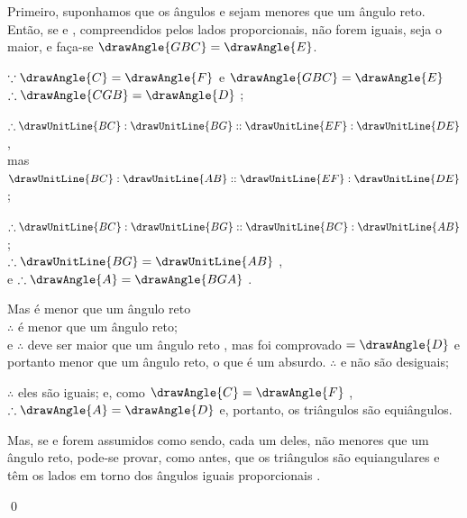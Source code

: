 \documentclass[booklanguage=brazilian]{byrnebook}
\begin{document}
\begin{center}
Primeiro, suponhamos que os ângulos  e  sejam menores que um ângulo reto. Então, se  e , compreendidos pelos lados proporcionais, não forem iguais, seja  o maior, e faça-se $\drawAngle{GBC} = \drawAngle{E}$.

$\because \drawAngle{C} = \drawAngle{F}$ \byref{\hypref} e $\drawAngle{GBC} = \drawAngle{E}$ \byref{\constref}\\ %
$\therefore \drawAngle{CGB} = \drawAngle{D}$ ;

$\therefore \drawUnitLine{BC} : \drawUnitLine{BG} :: \drawUnitLine{EF} : \drawUnitLine{DE}$ ,\\
mas $\drawUnitLine{BC} : \drawUnitLine{AB} :: \drawUnitLine{EF} : \drawUnitLine{DE}$ \byref{\hypref};

$\therefore \drawUnitLine{BC} : \drawUnitLine{BG} :: \drawUnitLine{BC} : \drawUnitLine{AB}$;\\
$\therefore \drawUnitLine{BG} = \drawUnitLine{AB}$ ,\\
e $\therefore \drawAngle{A} = \drawAngle{BGA}$ .

Mas  é menor que um ângulo reto \byref{\hypref}\\
$\therefore$  é menor que um ângulo reto;\\
e $\therefore$  deve ser maior que um ângulo reto , mas foi comprovado $= \drawAngle{D}$ e portanto menor que um ângulo reto, o que é um absurdo. $\therefore$  e  não são desiguais;

$\therefore$ eles são iguais; e, como $\drawAngle{C} = \drawAngle{F}$ \byref{\hypref},\\
$\therefore \drawAngle{A} = \drawAngle{D}$  e, portanto, os triângulos são equiângulos.
\end{center}

Mas, se  e  forem assumidos como sendo, cada um deles, não menores que um ângulo reto, pode-se provar, como antes, que os triângulos são equiangulares e têm os lados em torno dos ângulos iguais proporcionais .

\qed
\end{document}
